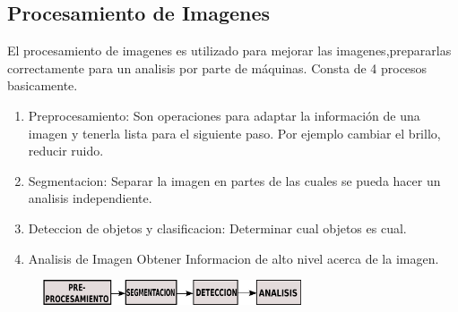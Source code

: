 \documentclass[conference]{IEEEtran}
\begin{document}
 \subsection{Procesamiento de Imagenes}
El procesamiento de imagenes es utilizado para mejorar las imagenes,prepararlas correctamente para un analisis por parte de m\'aquinas. Consta de 4 procesos basicamente.\cite{art_red1}
\begin{enumerate}
\item Preprocesamiento: Son operaciones para adaptar la informaci\'on de una imagen y tenerla lista para el siguiente paso. Por ejemplo cambiar el brillo, reducir ruido.
\item Segmentacion: Separar la imagen en partes de las cuales se pueda hacer un analisis independiente.
\item Deteccion de objetos y clasificacion: Determinar cual objetos es cual.
\item Analisis de Imagen Obtener Informacion de alto nivel acerca de la imagen.
\end{enumerate}
 \begin{figure}
	\centering
	\includegraphics[width=3.0in]{imagen5.pdf}
	
\end{figure}
\end{document}
